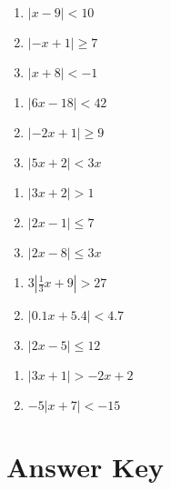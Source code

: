 \begin{multicols}{3}
\begin{enumerate}
	\item $|x-9| < 10$
	\item $|-x+1| \geq 7$
	\item $|x+8| < -1$
\end{enumerate}	\setcounter{Review}{\value{enumi}}
\end{multicols}
\begin{multicols}{3}
\begin{enumerate}	\setcounter{enumi}{\value{Review}}
	\item $|6x - 18| < 42$
	\item $|-2x+1| \geq 9$
	\item $|5x + 2| < 3x$
\end{enumerate}	\setcounter{Review}{\value{enumi}}
\end{multicols}
\begin{multicols}{3}
\begin{enumerate}	\setcounter{enumi}{\value{Review}}
	\item $|3x + 2| > 1$
    \item $|2x - 1| \leq 7$ 
    \item $|2x-8| \leq 3x$
\end{enumerate}	\setcounter{Review}{\value{enumi}}
\end{multicols}
\begin{multicols}{3}
\begin{enumerate}	\setcounter{enumi}{\value{Review}}
	\item $3\left| \frac{1}{3}x+9\right| > 27$
	\item $|0.1x+5.4| < 4.7$
	\item $|2x-5| \leq 12$
\end{enumerate}	\setcounter{Review}{\value{enumi}}
\end{multicols}
\begin{multicols}{3}
\begin{enumerate}	\setcounter{enumi}{\value{Review}}
	\item $|3x+1| > -2x+2$
	\item $-5|x+7| < -15$
\end{enumerate}	\setcounter{Review}{\value{enumi}}
\end{multicols}

\newpage

\section{Answer Key}

